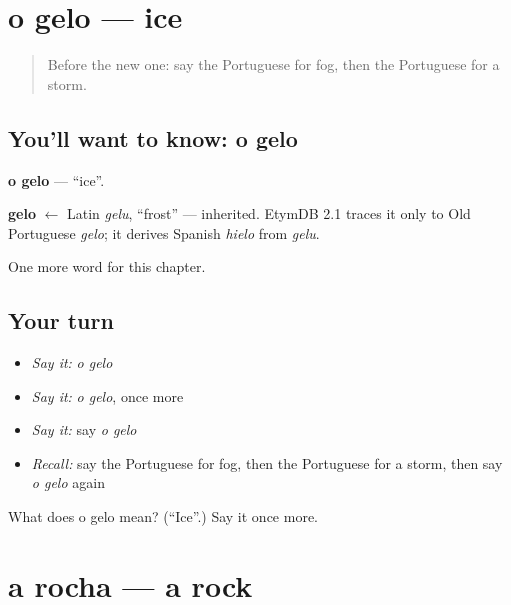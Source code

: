 \section[o gelo]{o gelo — ice}

\label{lesson:PT-C116-gelo}



\begin{quote}
Before the new one: say the Portuguese for fog, then the Portuguese for a storm.
\end{quote}

\subsection*{You'll want to know: o gelo}
\textbf{o gelo} — \textquotedblleft{}ice\textquotedblright{}.

\begin{cousinweb}
\textbf{gelo} $\leftarrow$ Latin \emph{gelu}, \textquotedblleft{}frost\textquotedblright{} — inherited. EtymDB 2.1 traces it only to Old Portuguese \emph{gelo}; it derives Spanish \emph{hielo} from \emph{gelu}.
\end{cousinweb}

\begin{grammarlens}[title={What you've built}]
One more word for this chapter.
\end{grammarlens}

\subsection*{Your turn}
\begin{itemize}
\raggedright
  \item \emph{Say it:} \emph{o gelo}
  \item \emph{Say it:} \emph{o gelo}, once more
  \item \emph{Say it:} say \emph{o gelo}
  \item \emph{Recall:} say the Portuguese for fog, then the Portuguese for a storm, then say \emph{o gelo} again
\end{itemize}

\begin{tcolorbox}[breakable,colback=teal!4,colframe=teal!35!black,title={Before you move on}]
What does o gelo mean? (\textquotedblleft{}Ice\textquotedblright{}.) Say it once more.
\end{tcolorbox}
\section[a rocha]{a rocha — a rock}

